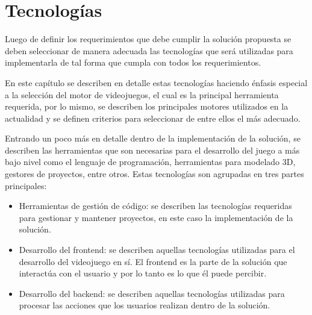 \chapter{Tecnologías}
\label{chap:tecnologias}

Luego de definir los requerimientos que debe cumplir la solución propuesta 
se deben seleccionar de manera adecuada las tecnologías que será utilizadas para 
implementarla de tal forma que cumpla con todos los requerimientos.

En este capítulo se describen en detalle estas tecnologías haciendo énfasis especial a 
la selección del motor de videojuegos, el cual es la principal herramienta requerida, por 
lo mismo, se describen los principales motores utilizados en la actualidad y se definen 
criterios para seleccionar de entre ellos el más adecuado.

Entrando un poco más en detalle dentro de la implementación de la solución, se describen 
las herramientas que son necesarias para el desarrollo del juego a más bajo nivel como el 
lenguaje de programación, herramientas para modelado 3D, gestores de proyectos, entre otros. 
Estas tecnologías son agrupadas en tres partes principales:

\begin{itemize}
    \item Herramientas de gestión de código: se describen las tecnologías requeridas 
    para gestionar y mantener proyectos, en este caso la implementación de la solución.
    \item Desarrollo del frontend: se describen aquellas tecnologías utilizadas 
    para el desarrollo del videojuego en sí. El frontend es la parte de la solución 
    que interactúa con el usuario y por lo tanto es lo que él puede percibir.
    \item Desarrollo del backend: se describen aquellas tecnologías utilizadas para 
    procesar las acciones que los usuarios realizan dentro de la solución.
\end{itemize}




